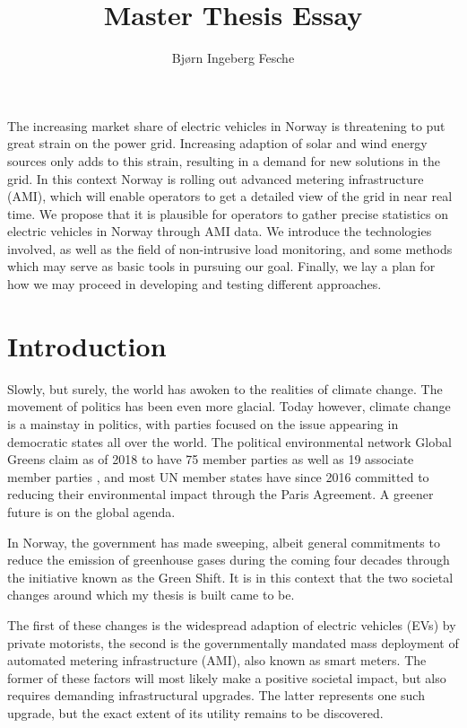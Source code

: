 \documentclass[12pt, american]{article}
\title{Master Thesis Essay}
\author{Bjørn Ingeberg Fesche}
\begin{document}
\maketitle
\abstract
The increasing market share of electric vehicles in Norway is threatening to put great strain on the power grid. Increasing adaption of solar and wind energy sources only adds to this strain, resulting in a demand for new solutions in the grid. In this context Norway is rolling out advanced metering infrastructure (AMI), which will enable operators to get a detailed view of the grid in near real time. We propose that it is plausible for operators to gather precise statistics on electric vehicles in Norway through AMI data. We introduce the technologies involved, as well as the field of non-intrusive load monitoring, and some methods which may serve as basic tools in pursuing our goal. Finally, we lay a plan for how we may proceed in developing and testing different approaches.

\tableofcontents
\section{Introduction}
Slowly, but surely, the world has awoken to the realities of climate change. The movement of politics has been even more glacial. Today however, climate change is a mainstay in politics, with parties focused on the issue appearing in democratic states all over the world. The political environmental network Global Greens claim as of 2018 to have 75 member parties as well as 19 associate member parties \cite{GlobalGreens}, and most UN member states have since 2016 committed to reducing their environmental impact through the Paris Agreement\cite{UNFCCC2015}. A greener future is on the global agenda.

In Norway, the government has made sweeping, albeit general commitments to reduce the emission of greenhouse gases during the coming four decades through the initiative known as the Green Shift\cite{NorwegianMinistryofClimateandEnvironment2014}. It is in this context that the two societal changes around which my thesis is built came to be. 

The first of these changes is the widespread adaption of electric vehicles (EVs) by private motorists, the second is the governmentally mandated mass deployment of automated metering infrastructure (AMI), also known as smart meters. The former of these factors will most likely make a positive societal impact, but also requires demanding infrastructural upgrades. The latter represents one such upgrade, but the exact extent of its utility remains to be discovered. 
\end{document}
